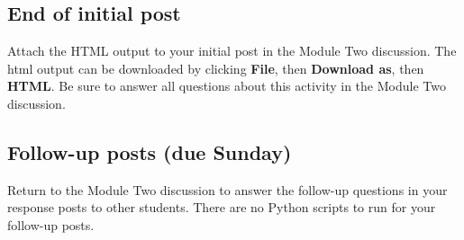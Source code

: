 \documentclass[11pt]{article}
\begin{document}
    

    \hypertarget{end-of-initial-post}{%
\subsection{End of initial post}\label{end-of-initial-post}}

Attach the HTML output to your initial post in the Module Two
discussion. The html output can be downloaded by clicking \textbf{File},
then \textbf{Download as}, then \textbf{HTML}. Be sure to answer all
questions about this activity in the Module Two discussion.

    \hypertarget{follow-up-posts-due-sunday}{%
\subsection{Follow-up posts (due
Sunday)}\label{follow-up-posts-due-sunday}}

Return to the Module Two discussion to answer the follow-up questions in
your response posts to other students. There are no Python scripts to
run for your follow-up posts.


    
    
    
    
\end{document}
